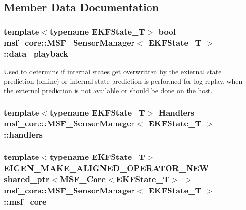 \subsection{Member Data Documentation}
\hypertarget{classmsf__core_1_1MSF__SensorManager_a49ac85275688e5588b73ed98795abe1a}{
\subsubsection[{data\-\_\-playback\-\_\-}]{\setlength{\rightskip}{0pt plus 5cm}template$<$typename E\-K\-F\-State\-\_\-\-T$>$ bool {\bf msf\-\_\-core\-::\-M\-S\-F\-\_\-\-Sensor\-Manager}$<$ E\-K\-F\-State\-\_\-\-T $>$\-::data\-\_\-playback\-\_\-\hspace{0.3cm}{\ttfamily [protected]}}}\label{classmsf__core_1_1MSF__SensorManager_a49ac85275688e5588b73ed98795abe1a}
Used to determine if internal states get overwritten by the external state prediction (online) or internal state prediction is performed for log replay, when the external prediction is not available or should be done on the host. \hypertarget{classmsf__core_1_1MSF__SensorManager_a7c6fe8b491f541562cbf863c452891fd}{
\subsubsection[{handlers}]{\setlength{\rightskip}{0pt plus 5cm}template$<$typename E\-K\-F\-State\-\_\-\-T$>$ {\bf Handlers} {\bf msf\-\_\-core\-::\-M\-S\-F\-\_\-\-Sensor\-Manager}$<$ E\-K\-F\-State\-\_\-\-T $>$\-::handlers\hspace{0.3cm}{\ttfamily [protected]}}}\label{classmsf__core_1_1MSF__SensorManager_a7c6fe8b491f541562cbf863c452891fd}
\hypertarget{classmsf__core_1_1MSF__SensorManager_ad08942e66e76a572cd6425b79e653fd2}{
\subsubsection[{msf\-\_\-core\-\_\-}]{\setlength{\rightskip}{0pt plus 5cm}template$<$typename E\-K\-F\-State\-\_\-\-T$>$ E\-I\-G\-E\-N\-\_\-\-M\-A\-K\-E\-\_\-\-A\-L\-I\-G\-N\-E\-D\-\_\-\-O\-P\-E\-R\-A\-T\-O\-R\-\_\-\-N\-E\-W shared\-\_\-ptr$<${\bf M\-S\-F\-\_\-\-Core}$<$E\-K\-F\-State\-\_\-\-T$>$ $>$ {\bf msf\-\_\-core\-::\-M\-S\-F\-\_\-\-Sensor\-Manager}$<$ E\-K\-F\-State\-\_\-\-T $>$\-::msf\-\_\-core\-\_\-}}\label{classmsf__core_1_1MSF__SensorManager_ad08942e66e76a572cd6425b79e653fd2}
